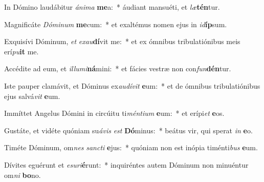 \item In Dómino laudábitur \textit{á}\textit{ni}\textit{ma} \textbf{me}a:~* áudiant mansuéti, et \textit{læ}\textbf{tén}tur.
\item Magnificáte \textit{Dó}\textit{mi}\textit{num} \textbf{me}cum:~* et exaltémus nomen ejus in \textit{id}\textbf{íp}sum.
\item Exquisívi Dóminum, \textit{et} \textit{ex}\textit{au}\textbf{dí}vit me:~* et ex ómnibus tribulatiónibus meis erí\textit{pu}\textbf{it} me.
\item Accédite ad eum, et \textit{il}\textit{lu}\textit{mi}\textbf{ná}mini:~* et fácies vestræ non con\textit{fun}\textbf{dén}tur.
\item Iste pauper clamávit, et Dóminus ex\textit{au}\textit{dí}\textit{vit} \textbf{e}um:~* et de ómnibus tribulatiónibus ejus salvá\textit{vit} \textbf{e}um.
\item Immíttet Angelus Dómini in circúitu ti\textit{mén}\textit{ti}\textit{um} \textbf{e}um:~* et erípi\textit{et} \textbf{e}os.
\item Gustáte, et vidéte quóniam su\textit{á}\textit{vis} \textit{est} \textbf{Dó}minus:~* beátus vir, qui sperat \textit{in} \textbf{e}o.
\item Timéte Dóminum, om\textit{nes} \textit{sanc}\textit{ti} \textbf{e}jus:~* quóniam non est inópia timénti\textit{bus} \textbf{e}um.
\item Dívites eguérunt et \textit{e}\textit{su}\textit{ri}\textbf{é}runt:~* inquiréntes autem Dóminum non minuéntur om\textit{ni} \textbf{bo}no.
